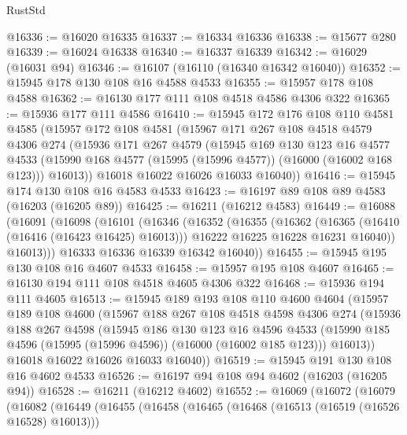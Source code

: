 \begin{lexlean}{RustStd}
\begin{coremodule}
{\begin{coremodule}
{{{{{{{{{{{{{{{{{{{{{{{{{{{{{{{{{{{{{{{{{{{{{{{{{{{{{{{{{{{{@16336 := @16020 @16335
@16337 := @16334 @16336
@16338 := @15677 @280
@16339 := @16024 @16338
@16340 := @16337 @16339
@16342 := @16029 (@16031 @94)
@16346 := @16107 (@16110 (@16340 @16342 @16040))
@16352 := @15945 @178 @130 @108 @16 @4588 @4533
@16355 := @15957 @178 @108 @4588
@16362 := @16130 @177 @111 @108 @4518 @4586 @4306 @322
@16365 := @15936 @177 @111 @4586
@16410 := @15945
    @172
    @176
    @108
    @110
    @4581
    @4585
    (@15957
      @172
      @108
      @4581
      (@15967
        @171
        @267
        @108
        @4518
        @4579
        @4306
        @274
        (@15936
          @171
          @267
          @4579
          (@15945
            @169
            @130
            @123
            @16
            @4577
            @4533
            (@15990 @168 @4577 (@15995 (@15996 @4577)) (@16000 (@16002 @168 @123)))
            @16013))
        @16018
        @16022
        @16026
        @16033
        @16040))
@16416 := @15945 @174 @130 @108 @16 @4583 @4533
@16423 := @16197 @89 @108 @89 @4583 (@16203 (@16205 @89))
@16425 := @16211 (@16212 @4583)
@16449 := @16088
    (@16091
      (@16098
        (@16101
          (@16346
            (@16352
              (@16355
                (@16362
                  (@16365 (@16410 (@16416 (@16423 @16425) @16013)))
                  @16222
                  @16225
                  @16228
                  @16231
                  @16040))
              @16013)))
        @16333
        @16336
        @16339
        @16342
        @16040))
@16455 := @15945 @195 @130 @108 @16 @4607 @4533
@16458 := @15957 @195 @108 @4607
@16465 := @16130 @194 @111 @108 @4518 @4605 @4306 @322
@16468 := @15936 @194 @111 @4605
@16513 := @15945
    @189
    @193
    @108
    @110
    @4600
    @4604
    (@15957
      @189
      @108
      @4600
      (@15967
        @188
        @267
        @108
        @4518
        @4598
        @4306
        @274
        (@15936
          @188
          @267
          @4598
          (@15945
            @186
            @130
            @123
            @16
            @4596
            @4533
            (@15990 @185 @4596 (@15995 (@15996 @4596)) (@16000 (@16002 @185 @123)))
            @16013))
        @16018
        @16022
        @16026
        @16033
        @16040))
@16519 := @15945 @191 @130 @108 @16 @4602 @4533
@16526 := @16197 @94 @108 @94 @4602 (@16203 (@16205 @94))
@16528 := @16211 (@16212 @4602)
@16552 := @16069
    (@16072
      (@16079
        (@16082
          (@16449
            (@16455
              (@16458
                (@16465
                  (@16468 (@16513 (@16519 (@16526 @16528) @16013)))
}}}}}}}}}}}}}}}}}}}}}}}}}}}}}}}}}}}}}}}}}}}}}}}}}}}}}}}}}}}}
\end{coremodule}}
\end{coremodule}
\end{lexlean}
